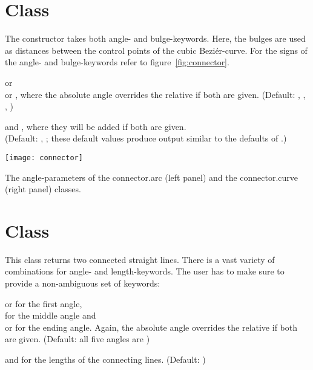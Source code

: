 \section{Class }

The constructor takes both angle- and bulge-keywords. Here, the bulges are
used as distances between the control points of the cubic Bezi\'er-curve.
For the signs of the angle- and bulge-keywords refer to figure~\ref{fig:connector}.

 or \\
 or , where the absolute angle overrides the
relative if both are given. (Default: ,
, , )\medskip

 and , where they will be added if both are
given.\\ (Default: , ; these default
values produce output similar to the defaults of .)\medskip


\texttt{[image: connector]}
\centerline{The angle-parameters of the connector.arc (left panel) and the
connector.curve (right panel) classes.}

\section{Class }

This class returns two connected straight lines. There is a vast variety of
combinations for angle- and length-keywords. The user has to make sure to
provide a non-ambiguous set of keywords:\medskip

 or  for the first angle,\\
 for the middle angle and\\
 or  for the ending angle.
Again, the absolute angle overrides the relative if both are given. (Default:
all five angles are )\medskip

 and  for the lengths of the connecting lines.
(Default: )


